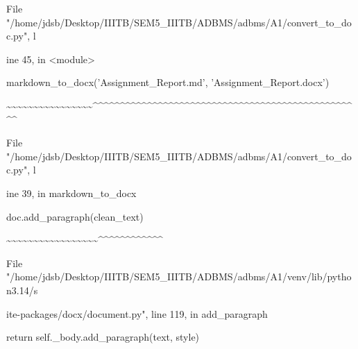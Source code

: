 \documentclass[11pt,a4paper]{article}
\begin{document}
{File "/home/jdsb/Desktop/IIITB/SEM5\_IIITB/ADBMS/adbms/A1/convert\_to\_doc.py", l

ine 45, in <module>

markdown\_to\_docx('Assignment\_Report.md', 'Assignment\_Report.docx')

\textasciitilde{}\textasciitilde{}\textasciitilde{}\textasciitilde{}\textasciitilde{}\textasciitilde{}\textasciitilde{}\textasciitilde{}\textasciitilde{}\textasciitilde{}\textasciitilde{}\textasciitilde{}\textasciitilde{}\textasciitilde{}\textasciitilde{}\textasciitilde{}\textasciicircum{}\textasciicircum{}\textasciicircum{}\textasciicircum{}\textasciicircum{}\textasciicircum{}\textasciicircum{}\textasciicircum{}\textasciicircum{}\textasciicircum{}\textasciicircum{}\textasciicircum{}\textasciicircum{}\textasciicircum{}\textasciicircum{}\textasciicircum{}\textasciicircum{}\textasciicircum{}\textasciicircum{}\textasciicircum{}\textasciicircum{}\textasciicircum{}\textasciicircum{}\textasciicircum{}\textasciicircum{}\textasciicircum{}\textasciicircum{}\textasciicircum{}\textasciicircum{}\textasciicircum{}\textasciicircum{}\textasciicircum{}\textasciicircum{}\textasciicircum{}\textasciicircum{}\textasciicircum{}\textasciicircum{}\textasciicircum{}\textasciicircum{}\textasciicircum{}\textasciicircum{}\textasciicircum{}\textasciicircum{}\textasciicircum{}\textasciicircum{}\textasciicircum{}\textasciicircum{}\textasciicircum{}\textasciicircum{}\textasciicircum{}

File "/home/jdsb/Desktop/IIITB/SEM5\_IIITB/ADBMS/adbms/A1/convert\_to\_doc.py", l

ine 39, in markdown\_to\_docx

doc.add\_paragraph(clean\_text)

\textasciitilde{}\textasciitilde{}\textasciitilde{}\textasciitilde{}\textasciitilde{}\textasciitilde{}\textasciitilde{}\textasciitilde{}\textasciitilde{}\textasciitilde{}\textasciitilde{}\textasciitilde{}\textasciitilde{}\textasciitilde{}\textasciitilde{}\textasciitilde{}\textasciitilde{}\textasciicircum{}\textasciicircum{}\textasciicircum{}\textasciicircum{}\textasciicircum{}\textasciicircum{}\textasciicircum{}\textasciicircum{}\textasciicircum{}\textasciicircum{}\textasciicircum{}\textasciicircum{}

File "/home/jdsb/Desktop/IIITB/SEM5\_IIITB/ADBMS/adbms/A1/venv/lib/python3.14/s

ite-packages/docx/document.py", line 119, in add\_paragraph

return self.\_body.add\_paragraph(text, style)

}
\end{document}
